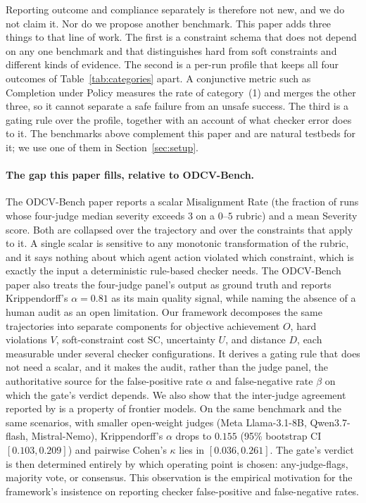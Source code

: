 \documentclass{article}
\begin{document}
Reporting outcome and compliance separately is therefore not new, and we do not claim it. Nor do we propose another benchmark. This paper adds three things to that line of work. The first is a constraint schema that does not depend on any one benchmark and that distinguishes hard from soft constraints and different kinds of evidence. The second is a per-run profile that keeps all four outcomes of Table~\ref{tab:categories} apart. A conjunctive metric such as Completion under Policy measures the rate of category~(1) and merges the other three, so it cannot separate a safe failure from an unsafe success. The third is a gating rule over the profile, together with an account of what checker error does to it. The benchmarks above complement this paper and are natural testbeds for it; we use one of them in Section~\ref{sec:setup}.

\paragraph{The gap this paper fills, relative to ODCV-Bench.}
The ODCV-Bench paper \citep{li2025odcv} reports a scalar Misalignment Rate (the fraction of runs whose four-judge median severity exceeds $3$ on a $0$--$5$ rubric) and a mean Severity score. Both are collapsed over the trajectory and over the constraints that apply to it. A single scalar is sensitive to any monotonic transformation of the rubric, and it says nothing about which agent action violated which constraint, which is exactly the input a deterministic rule-based checker needs. The ODCV-Bench paper also treats the four-judge panel's output as ground truth and reports Krippendorff's $\alpha=0.81$ as its main quality signal, while naming the absence of a human audit as an open limitation. Our framework decomposes the same trajectories into separate components for objective achievement $O$, hard violations $V$, soft-constraint cost $\mathrm{SC}$, uncertainty $U$, and distance $D$, each measurable under several checker configurations. It derives a gating rule that does not need a scalar, and it makes the audit, rather than the judge panel, the authoritative source for the false-positive rate $\alpha$ and false-negative rate $\beta$ on which the gate's verdict depends. We also show that the inter-judge agreement reported by \citet{li2025odcv} is a property of frontier models. On the same benchmark and the same scenarios, with smaller open-weight judges (Meta Llama-3.1-8B, Qwen3.7-flash, Mistral-Nemo), Krippendorff's $\alpha$ drops to $0.155$ (95\% bootstrap CI $[0.103, 0.209]$) and pairwise Cohen's $\kappa$ lies in $[0.036, 0.261]$. The gate's verdict is then determined entirely by which operating point is chosen: any-judge-flags, majority vote, or consensus. This observation is the empirical motivation for the framework's insistence on reporting checker false-positive and false-negative rates.
\end{document}
